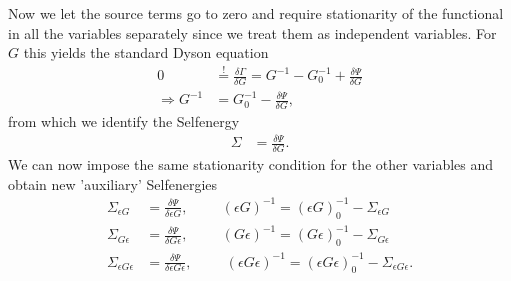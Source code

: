 \documentclass[12pt,a4paper]{scrartcl}
\numberwithin{equation}{section}
\begin{document}
Now we let the source terms go to zero and require stationarity of the functional in all the variables
separately since we treat them as independent variables. For $G$ this yields the standard Dyson equation
\begin{align}
  0 & \stackrel{!}{=}\frac{\delta \Gamma}{\delta G}  = G^{-1} - G^{-1}_0 + \frac{\delta \Psi}{\delta G} \\
  \Rightarrow G^{-1} &=  G^{-1}_0 -  \frac{\delta \Psi}{\delta G} ,
\end{align}
from which we identify the Selfenergy
\begin{align}
  \Sigma &=  \frac{\delta \Psi}{\delta G}.
\end{align}
We can now impose the same stationarity condition for the other variables and obtain new 'auxiliary' Selfenergies
\begin{align}
 \Sigma_{\epsilon G} &= \frac{\delta \Psi}{\delta \epsilon G},  \hspace{1cm} (\epsilon G)^{-1} =  (\epsilon G)^{-1}_0 -  \Sigma_{\epsilon G} \\
 \Sigma_{G \epsilon} &= \frac{\delta \Psi}{\delta G \epsilon},  \hspace{1cm} (G \epsilon)^{-1} =  (G \epsilon ) ^{-1}_0 -  \Sigma_{G \epsilon} \\
 \Sigma_{\epsilon G \epsilon} &= \frac{\delta \Psi}{\delta \epsilon G \epsilon},  \hspace{1cm} (\epsilon G \epsilon)^{-1} =  (\epsilon G \epsilon ) ^{-1}_0 -  \Sigma_{\epsilon G \epsilon} .
\end{align}
\end{document}
